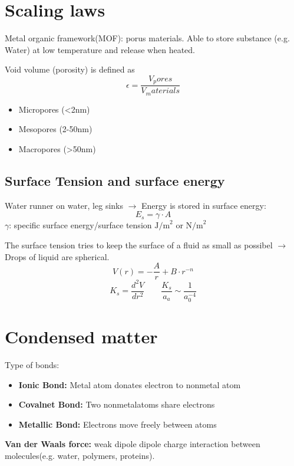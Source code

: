 \section{Scaling laws}


Metal organic framework(MOF): porus materials. Able to store substance (e.g. Water) at low temperature and release when heated.

Void volume (porosity) is defined as
\[
\epsilon = \frac{V_pores}{V_materials}
\]
\begin{itemize}
    \item Micropores (<2nm)
    \item Mesopores (2-50nm)
    \item Macropores (>50nm)
\end{itemize}
\subsection{Surface Tension and surface energy}
Water runner on water, leg sinks \(\rightarrow\) Energy is stored in surface energy:
\[
E_s = \gamma \cdot A
\]
\(\gamma\): specific surface energy/surface tension \(\text{J/m}^2\) or \(\text{N/m}^2\) 

The surface tension tries to keep the surface of a fluid as small as possibel \(\rightarrow\) Drops of liquid are spherical.
\[
V(r) = -\frac{A}{r} +B \cdot r^{-n}
\]
\[
K_s = \frac{d^2V}{dr^2} \qquad \frac{K_s}{a_a} \sim \frac{1}{a_0^{-4}}
\]%
\section{Condensed matter}
Type of bonds:
\begin{itemize}
    \item \textbf{Ionic Bond:} Metal atom donates electron to nonmetal atom
    \item \textbf{Covalnet Bond:} Two nonmetalatoms share electrons
    \item \textbf{Metallic Bond:} Electrons move freely between atoms
\end{itemize}
\textbf{Van der Waals force:} weak dipole dipole charge interaction between molecules(e.g. water, polymers, proteins).

